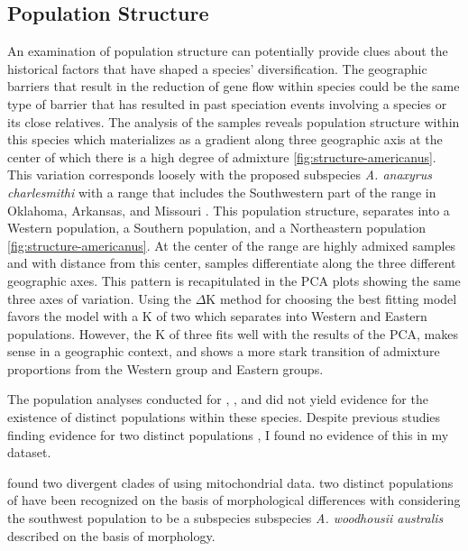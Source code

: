 \subsection{Population Structure}
An examination of population structure can potentially provide clues about the 
historical factors that have shaped a species' diversification.
The geographic barriers that result in the reduction of gene flow within species
could be the same type of barrier that has resulted in past speciation events 
involving a species or its close relatives.
The \structure analysis of the \amer samples reveals population structure within 
this species which materializes as a gradient along three geographic axis at the center of  
which there is a high degree of admixture \cref{fig:structure-americanus}.
This variation corresponds loosely with the proposed subspecies 
\textit{A. anaxyrus charlesmithi} with a range that includes the Southwestern 
part of the \amer range in Oklahoma, Arkansas, and Missouri \parencite{bragg1954}.
This population structure, separates \amer into a Western population, a Southern population, and
a Northeastern population \cref{fig:structure-americanus}.
At the center of the range are highly admixed samples and with distance from 
this center, samples differentiate along the three different geographic axes.
This pattern is recapitulated in the PCA plots showing the same three axes of 
variation. 
Using the $\Delta$K method for choosing the best fitting \structure model  
favors the model with a K of two which separates \amer into Western and Eastern
populations. 
However, the K of three fits well with the results of the PCA, 
makes sense in a geographic context, and shows a more stark transition of 
admixture proportions from the Western group and Eastern groups.



The population \structure analyses conducted for \fowl, \terr, and \wood  
did not yield evidence for the existence of distinct populations within these 
species. 
Despite previous studies finding evidence for two distinct \wood populations 
\cite{masta2003,shannon1955}, I found \wood no evidence of this in my dataset.






\cite{masta2003} found two divergent clades of \wood using mitochondrial data.
\cite{conant1998} two distinct populations of \wood have been recognized on 
the basis of morphological differences with considering the southwest population
to be a subspecies 
\cite{shannon1955} subspecies \textit{A. woodhousii australis} described on the  
basis of morphology.

